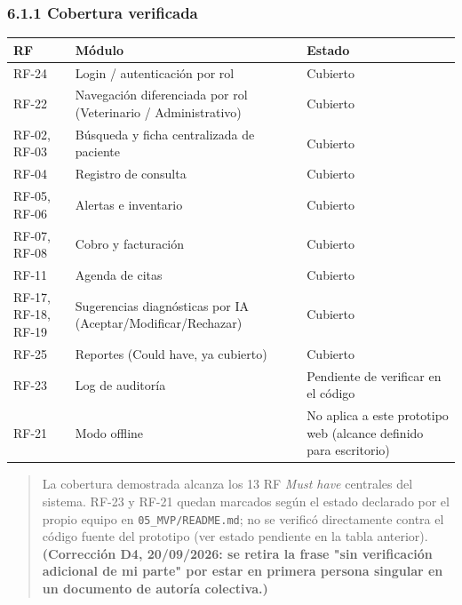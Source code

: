 \documentclass[
]{article}
\newcounter{none} %
\begin{document}
\subsubsection{6.1.1 Cobertura verificada}\label{s6-1-1-cobertura-verificada}

{\def\LTcaptype{none} %
\begin{longtable}[]{|
  >{\raggedright\arraybackslash}p{}|
  >{\raggedright\arraybackslash}p{}|
  >{\raggedright\arraybackslash}p{}|}
\hline
\begin{minipage}[b]{\linewidth}\raggedright
\textbf{RF}
\end{minipage} & \begin{minipage}[b]{\linewidth}\raggedright
\textbf{Módulo}
\end{minipage} & \begin{minipage}[b]{\linewidth}\raggedright
\textbf{Estado}
\end{minipage} \\
\hline
\endhead
\hline
\endlastfoot
RF-24 & Login / autenticación por rol & Cubierto \\
\hline
RF-22 & Navegación diferenciada por rol (Veterinario / Administrativo) & Cubierto \\
\hline
RF-02, RF-03 & Búsqueda y ficha centralizada de paciente & Cubierto \\
\hline
RF-04 & Registro de consulta & Cubierto \\
\hline
RF-05, RF-06 & Alertas e inventario & Cubierto \\
\hline
RF-07, RF-08 & Cobro y facturación & Cubierto \\
\hline
RF-11 & Agenda de citas & Cubierto \\
\hline
RF-17, RF-18, RF-19 & Sugerencias diagnósticas por IA (Aceptar/Modificar/Rechazar) & Cubierto \\
\hline
RF-25 & Reportes (Could have, ya cubierto) & Cubierto \\
\hline
RF-23 & Log de auditoría & Pendiente de verificar en el código \\
\hline
RF-21 & Modo offline & No aplica a este prototipo web (alcance definido para escritorio) \\
\hline
\end{longtable}
}

\begin{quote}
La cobertura demostrada alcanza los 13 RF \emph{Must have} centrales del
sistema. RF-23 y RF-21 quedan marcados según el estado declarado por el
propio equipo en \texttt{05\_MVP/README.md}; no se verificó directamente
contra el código fuente del prototipo (ver estado pendiente en la tabla
anterior). \textbf{(Corrección D4, 20/09/2026: se retira la frase "sin
verificación adicional de mi parte" por estar en primera persona
singular en un documento de autoría colectiva.)}
\end{quote}
\end{document}
